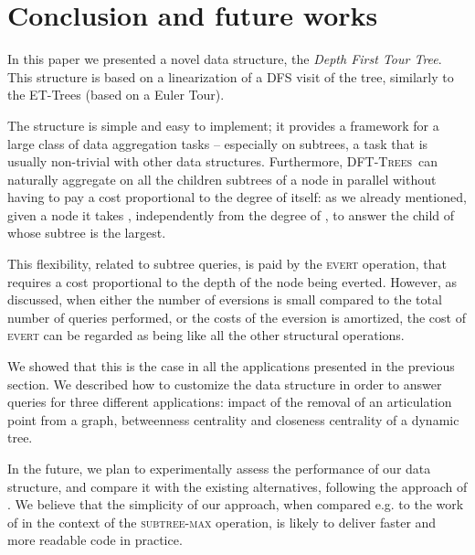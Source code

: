 \documentclass[a4paper,USenglish]{lipics}
\newcommand{\dfts}{\textsc{DFT-Trees}}
\begin{document}
\section{Conclusion and future works}
\label{sec:conclusion}


In this paper we presented a novel data structure, the \emph{Depth First Tour Tree}. This structure is based on a linearization of a DFS visit of the tree, similarly to the ET-Trees (based on a Euler Tour). 

The structure is simple and easy to implement; it provides a framework for a large class of data aggregation tasks -- especially on subtrees, a task that is usually non-trivial with other data structures. 
Furthermore, \dfts\ can naturally aggregate on all the children subtrees of a node  in parallel without having to pay a cost proportional to the degree of  itself: as we already mentioned, given a node  it takes , independently from the degree of , to answer the child of  whose subtree is the largest.

This flexibility, related to subtree queries, is paid by the \textsc{evert} operation, that requires a cost proportional to the depth of the node being everted. However, as discussed, when either the number of eversions is small compared to the total number of queries performed, or the costs of the eversion is amortized, the cost of \textsc{evert} can be regarded as being  like all the other structural operations. 

We showed that this is the case in all the applications presented in the previous section. We described how to customize the data structure in order to answer queries for three different applications: impact of the removal of an articulation point from a graph, betweenness centrality and closeness centrality of a dynamic tree. 

In the future, we plan to experimentally assess the performance of our data structure, and compare it with the existing alternatives, following the approach of \cite{TW09}. We believe that the simplicity of our approach, when compared e.g. to the work of \cite{Radzik98implementationof} in the context of the \textsc{subtree-max} operation, is likely to deliver faster and more readable code in practice.


		
\vfill 
\pagebreak









\end{document}
